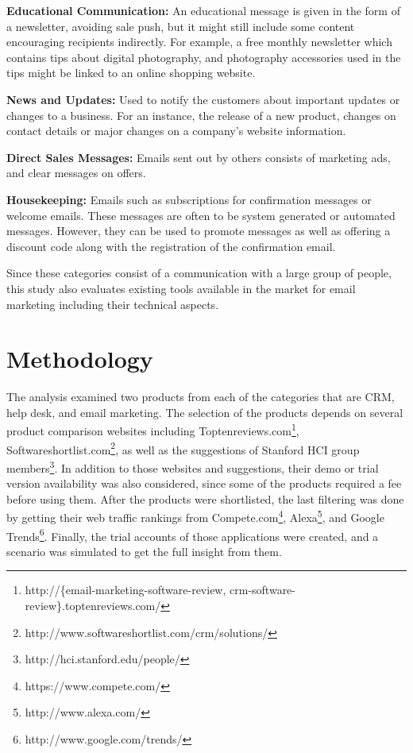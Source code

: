 \begin{compactitem}
	\item \textbf{Educational Communication:} An educational message is given in the form of a newsletter, avoiding sale push, but it might still include some content encouraging recipients indirectly. For example, a free monthly newsletter which contains tips about digital photography, and photography accessories used in the tips might be linked to an online shopping website. 
	\item \textbf{News and Updates:} Used to notify the customers about important updates or changes to a business. For an instance, the release of a new product, changes on contact details or major changes on a company's website information.
	\item \textbf{Direct Sales Messages:} Emails sent out by others consists of marketing ads, and clear messages on offers.
	\item \textbf{Housekeeping:} Emails such as subscriptions for confirmation messages or welcome emails. These messages are often to be system generated or automated messages. However, they can be used to promote messages as well as offering a discount code along with the registration of the confirmation email.
\end{compactitem}

Since these categories consist of a communication with a large group of people, this study also evaluates existing tools available in the market for email marketing including their technical aspects.

\section{Methodology}
\label{sec:3.2:Meth}

The analysis examined two products from each of the categories that are \ac{CRM}, help desk, and email marketing. The selection of the products depends on several product comparison websites including Toptenreviews.com\footnote{http://\{email-marketing-software-review, crm-software-review\}.toptenreviews.com/ }, Softwareshortlist.com\footnote{http://www.softwareshortlist.com/crm/solutions/}, as well as the suggestions of Stanford HCI group members\footnote{http://hci.stanford.edu/people/}. In addition to those websites and suggestions, their demo or trial version availability was also considered, since some of the products required a fee before using them. After the products were shortlisted, the last filtering was done by getting their web traffic rankings from Compete.com\footnote{https://www.compete.com/}, Alexa\footnote{http://www.alexa.com/}, and Google Trends\footnote{http://www.google.com/trends/}. Finally, the trial accounts of those applications were created, and a scenario was simulated to get the full insight from them. 

